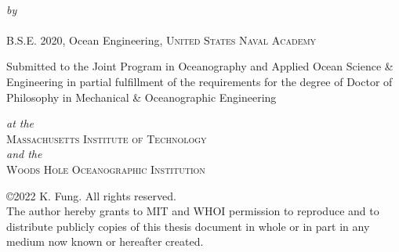 \def\signature#1#2{\par\noindent#1\dotfill\null\\*
  {\raggedleft #2\par}}


\makeatletter

\begin{titlepage}
  \begin{center}
    \begin{Large}
      \@title
    \end{Large}\\[0.1em]
    \emph{\footnotesize by}\\
    {\large \@author} \\[-0.25em]
    B.S.E. 2020, Ocean Engineering, \textsc{United States Naval Academy} \\ [2em]
    \begin{singlespace}
    {Submitted to the Joint Program in Oceanography and Applied Ocean Science \& Engineering in partial fulfillment of the requirements for the degree of Doctor of Philosophy in Mechanical \& Oceanographic Engineering} \\
    \end{singlespace}
    \emph{\footnotesize at the}\\
    {\large \textsc{Massachusetts Institute of Technology}} \\
    \emph{\footnotesize and the}\\
    {\large \textsc{Woods Hole Oceanographic Institution}} \\ [2em]
    \begin{singlespace}
    {\copyright2022 K. Fung. All rights reserved. \\ The author hereby grants to MIT and WHOI permission to reproduce and to distribute publicly copies of this thesis document in whole or in part in any medium now known or hereafter created.} \\ [2em]


\end{singlespace}
\end{center}
\end{titlepage}
